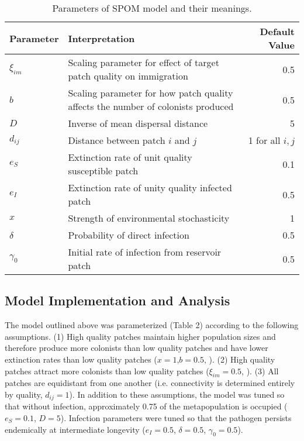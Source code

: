 \documentclass{svjour3}
\begin{document}
\begin{table}[h!]
\label{parameters}      
\caption{Parameters of SPOM model and their meanings.}
\begin{tabular}{l p{11cm} r}
Parameter & Interpretation &  Default Value\\
\hline
$\xi_{im}$ & Scaling parameter for effect of target patch quality on immigration & 0.5\\
$b$ & Scaling parameter for how patch quality affects the number of colonists produced & 0.5\\
$D$& Inverse of mean dispersal distance & 5\\
$d_{ij}$ & Distance between patch $i$ and $j$ & 1 for all $i,j$\\
\hline
$e_S$ & Extinction rate of unit quality susceptible patch & 0.1\\
$e_I$ & Extinction rate of unity quality infected patch & 0.5\\
$x$ & Strength of environmental stochasticity & 1\\
\hline
$\delta$ & Probability of direct infection & 0.5\\
$\gamma_0$ & Initial rate of infection from reservoir patch & 0.5
\end{tabular}
\end{table}

\subsection{Model Implementation and Analysis}

The model outlined above was parameterized (Table 2) according to the following assumptions. (1) High quality patches maintain higher population sizes and therefore produce more colonists than low quality patches and have lower extinction rates than low quality patches ($x=1$,$b=0.5$, \cite{Hanski2003}).  (2) High quality patches attract more colonists than low quality patches ($\xi_{im}=0.5$, \cite{Hanski2003}).  (3) All patches are equidistant from one another (i.e. connectivity is determined entirely by quality, $d_{ij}=1$).  In addition to these assumptions, the model was tuned so that without infection, approximately 0.75 of the metapopulation is occupied ($e_S = 0.1$, $D=5$).  Infection parameters were tuned so that the pathogen persists endemically at intermediate longevity ($e_I = 0.5$, $\delta = 0.5$, $\gamma_0 = 0.5$). 
\end{document}
